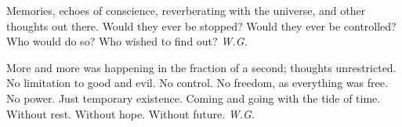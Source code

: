Memories, 
echoes of conscience, 
reverberating with the universe, 
and other thoughts 
out there. 
Would they ever be stopped? 
Would they ever be controlled? 
Who would do so? 
Who wished to find out? 
\emph{W.G.}

More and more 
was happening in the fraction 
of a second; 
thoughts unrestricted. 
No limitation 
to good and evil. 
No control. 
No freedom, 
as everything was free. 
No power. 
Just temporary 
existence. 
Coming and going 
with the tide of time. 
Without rest. 
Without hope. 
Without future. 
\emph{W.G.}

